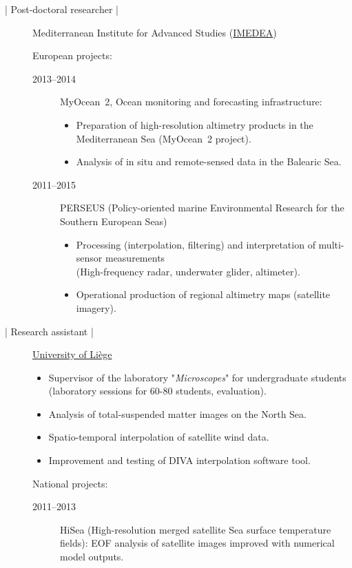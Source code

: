 \documentclass[10pt,a4paper,svgnames]{article}
\begin{document}
\begin{description}
\item[ | Post-doctoral researcher |] Mediterranean Institute for Advanced Studies (\href{http://imedea.uib-csic.es/}{IMEDEA})

European projects:
\begin{description}
\item[2013--2014] MyOcean~2, Ocean monitoring and forecasting infrastructure:
\begin{itemize}%
\item Preparation of high-resolution altimetry products in the Mediterranean Sea (MyOcean~2 project).
\item Analysis of in situ and remote-sensed data in the Balearic Sea.
\end{itemize}

\item[2011--2015] PERSEUS (Policy-oriented marine Environmental Research for the Southern European Seas)
\begin{itemize}%
\item Processing (interpolation, filtering) and interpretation of multi-sensor measurements\\(High-frequency radar, underwater glider, altimeter).
\item Operational production of regional altimetry maps (satellite imagery).
\end{itemize}
\end{description}


\item[ | Research assistant |] \href{www.ulg.ac.be}{University of Li\`{e}ge}
\begin{itemize}%
\item Supervisor of the laboratory "\textit{Microscopes}" for undergraduate students\\ (laboratory sessions for 60-80 students, evaluation).
\item Analysis of total-suspended matter images on the North Sea.
\item Spatio-temporal interpolation of satellite wind data.
\item Improvement and testing of DIVA interpolation software tool.
\end{itemize}

National projects:
\begin{description}
\item[2011--2013] HiSea (High-resolution merged satellite Sea surface temperature fields): EOF analysis of satellite images improved with numerical model outputs.
\end{description}


\end{description}
\end{document}
